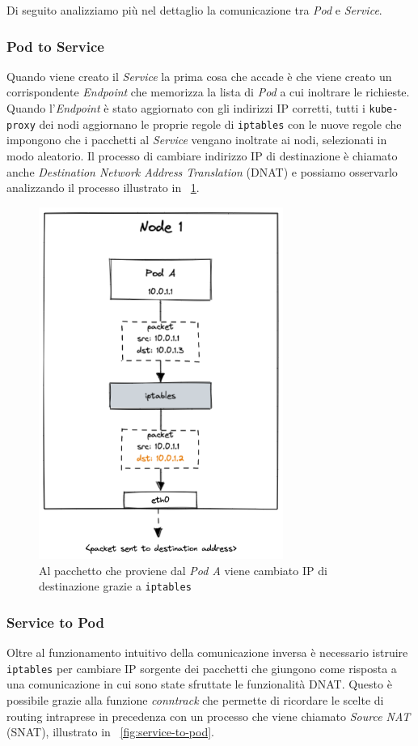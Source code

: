 \documentclass[12pt, hidelinks]{report}
\begin{document}
Di seguito analizziamo più nel dettaglio la comunicazione tra \textit{Pod} e \textit{Service}.

\subsubsection{Pod to Service}
Quando viene creato il \textit{Service} la prima cosa che accade è che viene creato un corrispondente \textit{Endpoint} che memorizza la lista di \textit{Pod} a cui inoltrare le richieste. Quando l'\textit{Endpoint} è stato aggiornato con gli indirizzi IP corretti, tutti i \texttt{kube-proxy} dei nodi aggiornano le proprie regole di \texttt{iptables} con le nuove regole che impongono che i pacchetti al \textit{Service} vengano inoltrate ai nodi, selezionati in modo aleatorio.
Il processo di cambiare indirizzo IP di destinazione è chiamato anche \textit{Destination Network Address Translation} (DNAT) e possiamo osservarlo analizzando il processo illustrato in \figurename~\ref{fig:pod-to-service}.

\begin{figure}[H]
    \centering
    \includegraphics[width=8cm]{7-pod-to-service.png}
    \caption{Al pacchetto che proviene dal \textit{Pod A} viene cambiato IP di destinazione grazie a \texttt{iptables} \cite{demystifying-kube-proxy}}
    \label{fig:pod-to-service}
\end{figure}

\subsubsection{Service to Pod}
Oltre al funzionamento intuitivo della comunicazione inversa è necessario istruire \texttt{iptables} per cambiare IP sorgente dei pacchetti che giungono come risposta a una comunicazione in cui sono state sfruttate le funzionalità DNAT. Questo è possibile grazie alla funzione \textit{conntrack} che permette di ricordare le scelte di routing intraprese in precedenza con un processo che viene chiamato \textit{Source NAT} (SNAT), illustrato in \figurename~\ref{fig:service-to-pod}.
\end{document}
